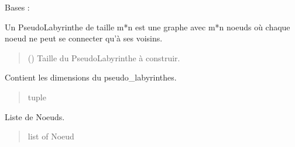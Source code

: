 \documentclass[letterpaper,10pt,french]{sphinxmanual}
\begin{document}
\begin{fulllineitems}
\label{\detokenize{src:src.utilites.PseudoLabyrinthe}}
\pysigstartsignatures
{}
\pysigstopsignatures
\sphinxAtStartPar
Bases : 

\sphinxAtStartPar
Un PseudoLabyrinthe de taille m*n est une graphe avec m*n noeuds où chaque
noeud ne peut se connecter qu’à ses voisins.
\begin{quote}\begin{description}
\sphinxAtStartPar
{} () \textendash{} Taille du PseudoLabyrinthe à construir.

\end{description}\end{quote}

\begin{fulllineitems}
\label{\detokenize{src:src.utilites.PseudoLabyrinthe.taille}}
\pysigstartsignatures
{}
\pysigstopsignatures
\sphinxAtStartPar
Contient les dimensions du pseudo\_labyrinthes.
\begin{quote}\begin{description}
\sphinxAtStartPar
tuple

\end{description}\end{quote}

\end{fulllineitems}


\begin{fulllineitems}
\label{\detokenize{src:src.utilites.PseudoLabyrinthe.__noeuds}}
\pysigstartsignatures
{}
\pysigstopsignatures
\sphinxAtStartPar
Liste de Noeuds.
\begin{quote}\begin{description}
\sphinxAtStartPar
list of Noeud


\end{description}
\end{quote}
\end{fulllineitems}
\end{fulllineitems}
\end{document}
